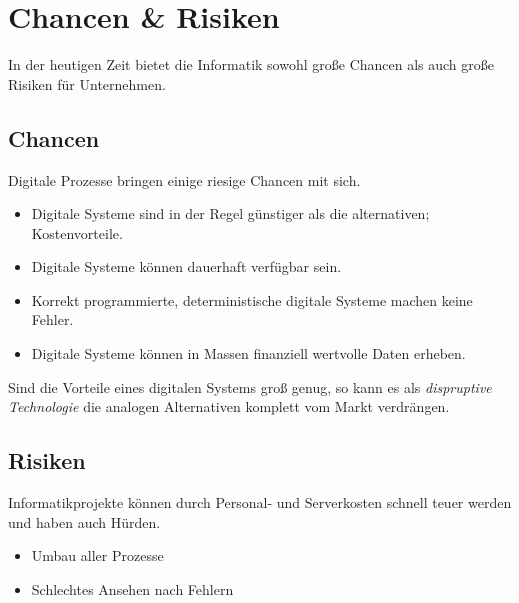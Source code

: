 \documentclass{article}
\begin{document}
\section{Chancen \& Risiken} 
In der heutigen Zeit bietet die Informatik sowohl große Chancen als auch große Risiken für Unternehmen.

\subsection{Chancen}
Digitale Prozesse bringen einige riesige Chancen mit sich.
\begin{itemize}
 \item Digitale Systeme sind in der Regel günstiger als die alternativen; Kostenvorteile.
 \item Digitale Systeme können dauerhaft verfügbar sein.
 \item Korrekt programmierte, deterministische digitale Systeme machen keine Fehler.
 \item Digitale Systeme können in Massen finanziell wertvolle Daten erheben.
\end{itemize}
Sind die Vorteile eines digitalen Systems groß genug, so kann es als \emph{dispruptive Technologie} die analogen Alternativen komplett vom Markt verdrängen. 

\subsection{Risiken}
Informatikprojekte können durch Personal- und Serverkosten schnell teuer werden und haben auch Hürden.
\begin{itemize}
 \item Umbau aller Prozesse
 \item Schlechtes Ansehen nach Fehlern
\end{itemize}
\end{document}
